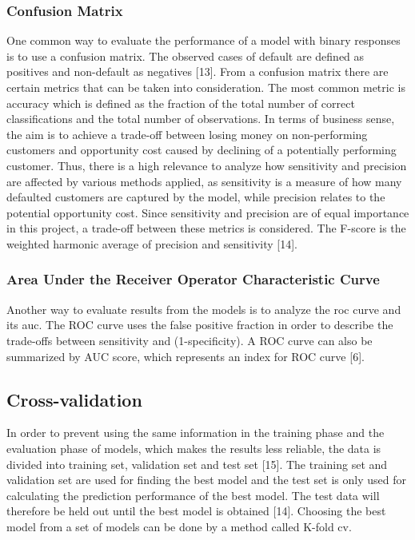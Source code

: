 \documentclass[a4paper]{article}
\begin{document}
\subsubsection{Confusion Matrix}
One common way to evaluate the performance of a model with binary responses is to use a confusion matrix. The observed cases of default are defined as positives and non-default as negatives [13]. From a confusion matrix there are certain metrics that can be taken into consideration. The most common metric is accuracy which is defined as the fraction of the total number of correct classifications and the total number of observations. In terms of business sense, the aim is to achieve a trade-off between losing money on non-performing customers and opportunity cost caused by declining of a potentially performing customer. Thus, there is a high relevance to analyze how sensitivity and precision are affected by various methods applied, as sensitivity is a measure of how many defaulted customers are captured by the model, while precision relates to the potential opportunity cost. Since sensitivity and precision are of equal importance in this project, a trade-off between these metrics is considered. The F-score is the weighted harmonic average of precision and sensitivity [14].

\subsubsection{Area Under the Receiver Operator Characteristic Curve}
Another way to evaluate results from the models is to analyze the \gls{roc} curve and its \gls{auc}. The ROC curve uses the false positive fraction in order to describe the trade-offs between sensitivity and (1-specificity). A ROC curve can also be summarized by AUC score, which represents an index for ROC curve [6].

\subsection{Cross-validation}
In order to prevent using the same information in the training phase and the evaluation phase of models, which makes the results less reliable, the data is divided into training set, validation set and test set [15]. The training set and validation set are used for finding the best model and the test set is only used for calculating the prediction performance of the best model. The test data will therefore be held out until the best model is obtained [14]. Choosing the best model from a set of models can be done by a method called K-fold \gls{cv}.
\end{document}
